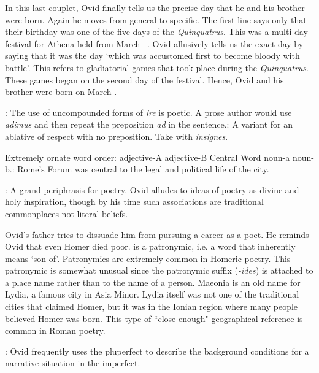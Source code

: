 
In this last couplet, Ovid finally tells us the precise day that he and his
brother were born.  Again he moves from general to specific.  The first line
says only that their birthday was one of the five days of the
\textit{Quinquatrus}.  This was a multi-day festival for Athena held from March
--.  Ovid allusively tells us the exact day by saying that it
was the day `which was accustomed first to become bloody with battle'.  This
refers to gladiatorial games that took place during the \textit{Quinquatrus}.
These games began on the second day of the festival.  Hence, Ovid and his
brother were born on March .


: The use of uncompounded forms of \textit{ire} is poetic.  A prose
author would use \textit{adimus} and then repeat the preposition \textit{ad} in
the sentence.\indent{}: A variant for an ablative of respect with no
preposition.  Take with \textit{insignes}.


Extremely ornate word order: adjective-A adjective-B Central Word noun-a
noun-b.\indent{}: Rome's Forum was central to the legal and
political life of the city.


: A grand periphrasis for poetry.  Ovid alludes to ideas
of poetry as divine and holy inspiration, though by his time such associations
are traditional commonplaces not literal beliefs.


Ovid's father tries to dissuade him from pursuing a career as a poet.  He
reminds Ovid that even Homer died poor.\indent{} is a patronymic,
i.e. a word that inherently means `son of'.  Patronymics are extremely common
in Homeric poetry.  This patronymic is somewhat unusual since the patronymic
suffix (\textit{-ides}) is attached to a place name rather than to the name of
a person.  Maeonia is an old name for Lydia, a famous city in Asia Minor.
Lydia itself was not one of the traditional cities that claimed Homer, but it
was in the Ionian region where many people believed Homer was born.  This type
of ``close enough" geographical reference is common in Roman poetry.


: Ovid frequently uses the pluperfect to
describe the background conditions for a narrative situation in the imperfect.

